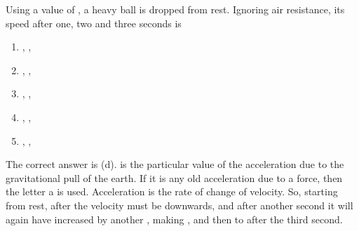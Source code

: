 
\begin{problem}[Robin4]
{Using a value of , a heavy ball is dropped from rest. Ignoring air resistance, its speed after one, two and three seconds is
\begin{enumerate}
	\item {}, , 
	\item {}, , 
	\item {}, , 
	\item {}, ,  \answer
	\item {}, , 
\end{enumerate}
}
{}
{The correct answer is (d).  is the particular value of the acceleration due to the gravitational pull of the earth. If it is any old acceleration due to a force, then the letter a is used. Acceleration is the rate of change of velocity. So, starting from rest, after  the velocity must be  downwards, and after another second it will again have increased by another , making , and then to  after the third second. }
\end{problem}
